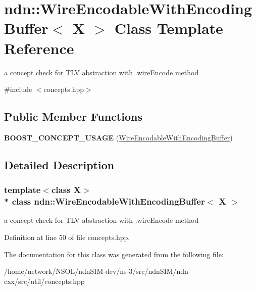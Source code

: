 \hypertarget{classndn_1_1WireEncodableWithEncodingBuffer}{}\section{ndn\+:\+:Wire\+Encodable\+With\+Encoding\+Buffer$<$ X $>$ Class Template Reference}
\label{classndn_1_1WireEncodableWithEncodingBuffer}


a concept check for T\+LV abstraction with .wire\+Encode method  




{\ttfamily \#include $<$concepts.\+hpp$>$}

\subsection*{Public Member Functions}
\begin{DoxyCompactItemize}
\item 
{\bfseries B\+O\+O\+S\+T\+\_\+\+C\+O\+N\+C\+E\+P\+T\+\_\+\+U\+S\+A\+GE} (\hyperlink{classndn_1_1WireEncodableWithEncodingBuffer}{Wire\+Encodable\+With\+Encoding\+Buffer})\hypertarget{classndn_1_1WireEncodableWithEncodingBuffer_aabcf7910d6f289cc0184dbeb1cb6e1cf}{}\label{classndn_1_1WireEncodableWithEncodingBuffer_aabcf7910d6f289cc0184dbeb1cb6e1cf}

\end{DoxyCompactItemize}


\subsection{Detailed Description}
\subsubsection*{template$<$class X$>$\\*
class ndn\+::\+Wire\+Encodable\+With\+Encoding\+Buffer$<$ X $>$}

a concept check for T\+LV abstraction with .wire\+Encode method 

Definition at line 50 of file concepts.\+hpp.



The documentation for this class was generated from the following file\+:\begin{DoxyCompactItemize}
\item 
/home/network/\+N\+S\+O\+L/ndn\+S\+I\+M-\/dev/ns-\/3/src/ndn\+S\+I\+M/ndn-\/cxx/src/util/concepts.\+hpp\end{DoxyCompactItemize}
